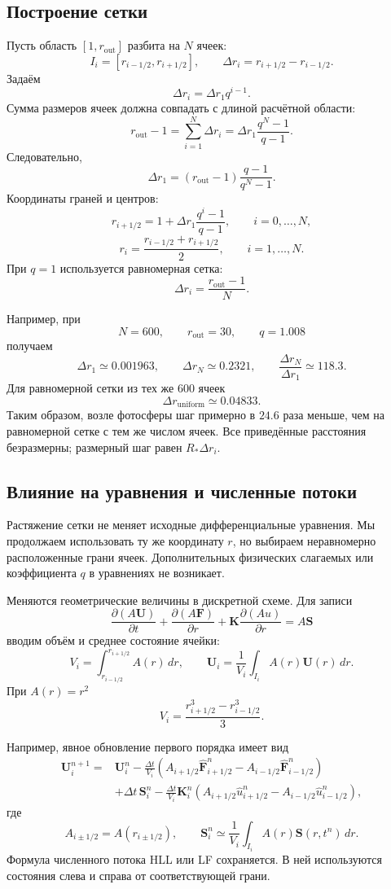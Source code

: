 \documentclass[11pt,a4paper]{article}
\begin{document}
\subsection{Построение сетки}

Пусть область $[1,r_{\mathrm{out}}]$ разбита
на $N$ ячеек:
\[
I_i=[r_{i-1/2},r_{i+1/2}],
\qquad
\Delta r_i=r_{i+1/2}-r_{i-1/2}.
\]
Задаём
\[
\Delta r_i=\Delta r_1q^{i-1}.
\]
Сумма размеров ячеек должна совпадать
с длиной расчётной области:
\[
r_{\mathrm{out}}-1
=\sum_{i=1}^{N}\Delta r_i
=\Delta r_1\frac{q^N-1}{q-1}.
\]
Следовательно,
\[
\Delta r_1
=(r_{\mathrm{out}}-1)\frac{q-1}{q^N-1}.
\]
Координаты граней и центров:
\[
r_{i+1/2}
=1+\Delta r_1\frac{q^i-1}{q-1},
\qquad i=0,\ldots,N,
\]
\[
r_i=\frac{r_{i-1/2}+r_{i+1/2}}{2},
\qquad i=1,\ldots,N.
\]
При $q=1$ используется равномерная сетка:
\[
\Delta r_i=\frac{r_{\mathrm{out}}-1}{N}.
\]

Например, при
\[
N=600,\qquad r_{\mathrm{out}}=30,\qquad q=1.008
\]
получаем
\[
\Delta r_1\simeq0.001963,\qquad
\Delta r_N\simeq0.2321,\qquad
\frac{\Delta r_N}{\Delta r_1}\simeq118.3.
\]
Для равномерной сетки из тех же $600$ ячеек
\[
\Delta r_{\mathrm{uniform}}\simeq0.04833.
\]
Таким образом, возле фотосферы шаг примерно
в $24.6$ раза меньше, чем на равномерной сетке
с тем же числом ячеек.
Все приведённые расстояния безразмерны;
размерный шаг равен $R_*\Delta r_i$.

\subsection{Влияние на уравнения и численные потоки}

Растяжение сетки не меняет исходные
дифференциальные уравнения.
Мы продолжаем использовать ту же координату $r$,
но выбираем неравномерно расположенные грани ячеек.
Дополнительных физических слагаемых
или коэффициента $q$ в уравнениях не возникает.

Меняются геометрические величины в дискретной схеме.
Для записи
\[
\frac{\partial(A\bm U)}{\partial t}
+\frac{\partial(A\bm F)}{\partial r}
+\bm K\frac{\partial(Au)}{\partial r}
=A\bm S
\]
вводим объём и среднее состояние ячейки:
\[
V_i=\int_{r_{i-1/2}}^{r_{i+1/2}}A(r)\,dr,
\qquad
\bm U_i
=\frac1{V_i}\int_{I_i}A(r)\bm U(r)\,dr.
\]
При $A(r)=r^2$
\[
V_i=\frac{r_{i+1/2}^3-r_{i-1/2}^3}{3}.
\]

Например, явное обновление первого порядка имеет вид
\[
\begin{aligned}
\bm U_i^{n+1}
={}&\bm U_i^n
-\frac{\Delta t}{V_i}
\left(
A_{i+1/2}\widehat{\bm F}_{i+1/2}^n
-A_{i-1/2}\widehat{\bm F}_{i-1/2}^n
\right)
\\
&+\Delta t\,\bm S_i^n
-\frac{\Delta t}{V_i}\bm K_i^n
\left(
A_{i+1/2}\widehat u_{i+1/2}^n
-A_{i-1/2}\widehat u_{i-1/2}^n
\right),
\end{aligned}
\]
где
\[
A_{i\pm1/2}=A(r_{i\pm1/2}),
\qquad
\bm S_i^n\simeq
\frac1{V_i}\int_{I_i}A(r)\bm S(r,t^n)\,dr.
\]
Формула численного потока HLL или LF сохраняется.
В ней используются состояния слева и справа
от соответствующей грани.
\end{document}

